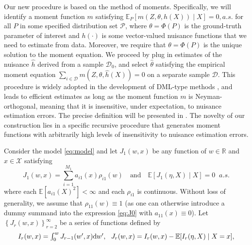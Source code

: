 \documentclass{article}
\def\gD{{\mathcal{D}}}
\def\gP{{\mathcal{P}}}
\def\gX{{\mathcal{X}}}
\newcommand{\E}{\mathbb{E}}
\newcommand{\R}{\mathbb{R}}
\newcommand{\dd}{\textup{d}}
\newcommand{\qtext}[1]{\quad\text{#1}\quad}
\begin{document}
Our new procedure is based on the method of moments. Specifically, we will identify a moment function $m$ satisfying $\E_P[m(Z,\theta,h(X)) \mid X]=0, a.s.$ for all $P$ in some specified distribution set $\gP$, where $\theta=\Phi(P)$ is the ground-truth parameter of interest and $h(\cdot)$ is some vector-valued nuisance functions that we need to estimate from data. Moreover, we require that $\theta=\Phi(P)$ is the unique solution to the moment equation. We proceed by plug in estimates of the nuisance $\hat{h}$ derived from a sample $\gD_0$, and select $\hat{\theta}$ satisfying the empirical moment equation $\sum_{i\in\gD} m(Z,\theta,\hat{h}(X)) = 0$ on a separate sample $\gD$. This procedure is widely adopted in the development of DML-type methods \citep{chernozhukov2018double}, and leads to efficient estimates as long as the moment function $m$ is Neyman-orthogonal, meaning that it is insensitive, under expectation, to nuisance estimation errors. The precise definition will be presented in . The novelty of our construction lies in a specific recursive procedure that generates moment functions with arbitrarily high levels of insensitivity to nuisance estimation errors.
%

Consider the model \eqref{eq:model} and let $J_1(w,x)$ be any function of $w\in\R$ and $x\in\gX$ satisfying
\begin{equation}
    \label{eq:J0}
    \textstyle
    J_1(w,x) = \sum_{i=1}^{M_1} a_{i1}(x)\rho_{i1}(w)
    \qtext{and}
    \E\left[ J_1(\eta, X) \mid X \right] = 0 \;\; a.s.
\end{equation}
where each $\E[a_{i1}(X)^2] < \infty$ and each $\rho_{i1}$ is continuous.
Without loss of generality, we assume that $\rho_{11}(w)\equiv 1$ (as one can otherwise introduce a dummy summand into the expression \cref{eq:J0} with $a_{11}(x)\equiv 0$). Let $\left\{J_r(w,x)\right\}_{r=2}^{\infty}$ be a series of functions defined by
%
\begin{equation}
    \label{eq:def-Jk-recursive}
    \begin{aligned}
    \textstyle
        I_{r}(w,x) = \int_0^w J_{r-1}(w',x)\dd w',\ \  J_{r}(w,x) = I_{r}(w,x) - \E[I_{r}(\eta,X)\mid X=x],
    \end{aligned}
\end{equation}
\end{document}
